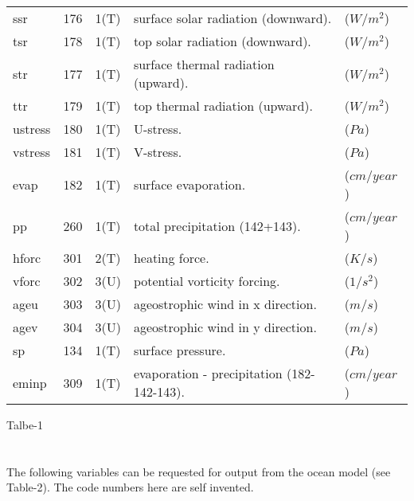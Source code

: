 \begin{tabular}{lllll}
 ssr   &  176   &  1(T)	&surface solar radiation (downward).&($W/m^2$)      \\
 tsr   &  178   &  1(T)	&top solar radiation (downward).    & ($W/m^2$)     \\
 str    & 177   &  1(T)	&surface thermal radiation (upward).& ($W/m^2$)     \\
 ttr    & 179   &  1(T)	&top thermal radiation (upward).    & ($W/m^2$)     \\
 ustress& 180   &  1(T) &U-stress.                           & ($Pa$)       \\
 vstress& 181   &  1(T) &V-stress.                           & ($Pa$)       \\
 evap  &  182   &  1(T)	&surface evaporation.		     & ($cm/year$)  \\
 pp    &  260   &  1(T)	&total precipitation (142+143).	     & ($cm/year$)  \\   
 hforc &  301   &  2(T)	&heating force.			     &  ($K/s$)     \\
 vforc &  302   &  3(U)	&potential vorticity forcing.	     &  ($1/s^2$)   \\
 ageu  &  303   &  3(U)	&ageostrophic wind in x direction.   &  ($m/s$)     \\
 agev  &  304   &  3(U)	&ageostrophic wind in y direction.   &  ($m/s$)     \\
 sp    &  134   &  1(T)	&surface pressure.                   &  ($Pa$)     \\
 eminp &  309   &  1(T)	&evaporation - precipitation (182-142-143).  & ($cm/year$) \\  \hline
\hline    
\end{tabular}
Talbe-1
\\
\\ 
\\ 
The following variables can be requested for output from the ocean model (see Table-2).  
The code numbers here are self invented.
\\ 
\\
\\
